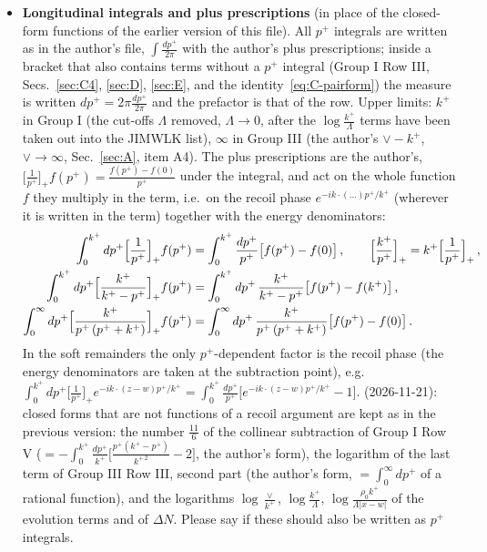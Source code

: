 \documentclass[9pt]{article}
\numberwithin{equation}{section}
\newcommand{\NOTE}{{\color{red}\textbf{NOTE}}}
\begin{document}
\begin{itemize}
\item \textbf{Longitudinal integrals and plus prescriptions} (in place of the closed-form functions of the earlier version of this file). All $p^{+}$ integrals are written as in the author's file, $\int\frac{dp^{+}}{2\pi}$ with the author's plus prescriptions; inside a bracket that also contains terms without a $p^{+}$ integral (Group I Row III, Secs.~\ref{sec:C4}, \ref{sec:D}, \ref{sec:E}, and the identity~\eqref{eq:C-pairform}) the measure is written $dp^{+}=2\pi\frac{dp^{+}}{2\pi}$ and the prefactor is that of the row. Upper limits: $k^{+}$ in Group I (the cut-offs $\Lambda$ removed, $\Lambda\to0$, after the $\log\frac{k^{+}}{\Lambda}$ terms have been taken out into the JIMWLK list), $\infty$ in Group III (the author's $\vee-k^{+}$, $\vee\to\infty$, Sec.~\ref{sec:A}, item A4). The plus prescriptions are the author's, $\big[\frac{1}{p^{+}}\big]_{+}f(p^{+})=\frac{f(p^{+})-f(0)}{p^{+}}$ under the integral, and act on the whole function $f$ they multiply in the term, i.e.\ on the recoil phase $e^{-ik\cdot(\dots)p^{+}/k^{+}}$ (wherever it is written in the term) together with the energy denominators:
\begin{align}\label{eq:plus}
\int_{0}^{k^{+}}dp^{+}\Big[\frac{1}{p^{+}}\Big]_{+}f(p^{+})&=\int_{0}^{k^{+}}\frac{dp^{+}}{p^{+}}\big[f(p^{+})-f(0)\big]\,,\qquad\Big[\frac{k^{+}}{p^{+}}\Big]_{+}=k^{+}\Big[\frac{1}{p^{+}}\Big]_{+}\,,\notag\\
\int_{0}^{k^{+}}dp^{+}\Big[\frac{k^{+}}{k^{+}-p^{+}}\Big]_{+}f(p^{+})&=\int_{0}^{k^{+}}dp^{+}\,\frac{k^{+}}{k^{+}-p^{+}}\big[f(p^{+})-f(k^{+})\big]\,,\notag\\
\int_{0}^{\infty}dp^{+}\Big[\frac{k^{+}}{p^{+}\,(p^{+}+k^{+})}\Big]_{+}f(p^{+})&=\int_{0}^{\infty}dp^{+}\,\frac{k^{+}}{p^{+}\,(p^{+}+k^{+})}\big[f(p^{+})-f(0)\big]\,.
\end{align}
In the soft remainders the only $p^{+}$-dependent factor is the recoil phase (the energy denominators are taken at the subtraction point), e.g.\ $\int_{0}^{k^{+}}dp^{+}\big[\frac{1}{p^{+}}\big]_{+}e^{-ik\cdot(z-w)p^{+}/k^{+}}=\int_{0}^{k^{+}}\frac{dp^{+}}{p^{+}}\big[e^{-ik\cdot(z-w)p^{+}/k^{+}}-1\big]$. {\color{red}\NOTE{} (2026-11-21): closed forms that are not functions of a recoil argument are kept as in the previous version: the number $\frac{11}{6}$ of the collinear subtraction of Group I Row V ($=-\int_{0}^{k^{+}}\frac{dp^{+}}{k^{+}}\big[\frac{p^{+}(k^{+}-p^{+})}{k^{+\,2}}-2\big]$, the author's form), the logarithm of the last term of Group III Row III, second part (the author's form, $=\int_{0}^{\infty}dp^{+}$ of a rational function), and the logarithms $\log\frac{\vee}{k^{+}}$, $\log\frac{k^{+}}{\Lambda}$, $\log\frac{\rho_{0}k^{+}}{\Lambda|x-w|}$ of the evolution terms and of $\Delta N$. Please say if these should also be written as $p^{+}$ integrals.}

\end{itemize}
\end{document}
